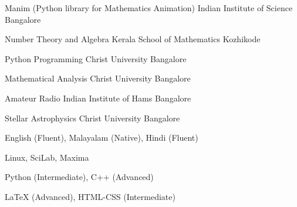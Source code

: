 {Manim (Python library for Mathematics Animation)}
{Indian Institute of Science}
{Bangalore}

{Number Theory and Algebra}
{Kerala School of Mathematics}
{Kozhikode}

{Python Programming}
{Christ University}
{Bangalore}

{Mathematical Analysis}
{Christ University}
{Bangalore}

{Amateur Radio}
{Indian Institute of Hams}
{Bangalore}

{Stellar Astrophysics}
{Christ University}
{Bangalore}
\bigskip

{English (Fluent), Malayalam (Native), Hindi (Fluent)}

{Linux, SciLab, Maxima}

{Python (Intermediate), C++ (Advanced)}

{LaTeX (Advanced), HTML-CSS (Intermediate)}


